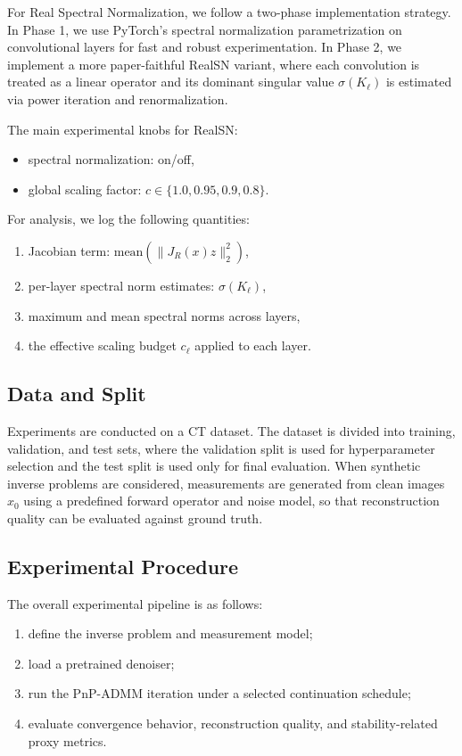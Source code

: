 \documentclass{article}
\begin{document}
For Real Spectral Normalization, we follow a two-phase implementation strategy.
In Phase 1, we use PyTorch's spectral normalization parametrization on convolutional layers for fast and robust experimentation.
In Phase 2, we implement a more paper-faithful RealSN variant, where each convolution is treated as a linear operator and its dominant singular value $\sigma(K_\ell)$ is estimated via power iteration and renormalization.

The main experimental knobs for RealSN:
\begin{itemize}
    \item spectral normalization: on/off,
    \item global scaling factor: $c \in \{1.0, 0.95, 0.9, 0.8\}$.
\end{itemize}


For analysis, we log the following quantities:
\begin{enumerate}
    \item Jacobian term: $\mathrm{mean}(\|J_R(x)z\|_2^2)$,
    \item per-layer spectral norm estimates: $\sigma(K_\ell)$,
    \item maximum and mean spectral norms across layers,
    \item the effective scaling budget $c_\ell$ applied to each layer.
\end{enumerate}

\subsection{Data and Split}
Experiments are conducted on a CT dataset.
The dataset is divided into training, validation, and test sets, where the validation split is used for hyperparameter selection and the test split is used only for final evaluation.
When synthetic inverse problems are considered, measurements are generated from clean images $x_0$ using a predefined forward operator and noise model, so that reconstruction quality can be evaluated against ground truth.

\subsection{Experimental Procedure}
The overall experimental pipeline is as follows:
\begin{enumerate}
    \item define the inverse problem and measurement model;
    \item load a pretrained denoiser;
    \item run the PnP-ADMM iteration under a selected continuation schedule;
    \item evaluate convergence behavior, reconstruction quality, and stability-related proxy metrics.
\end{enumerate}
\end{document}
